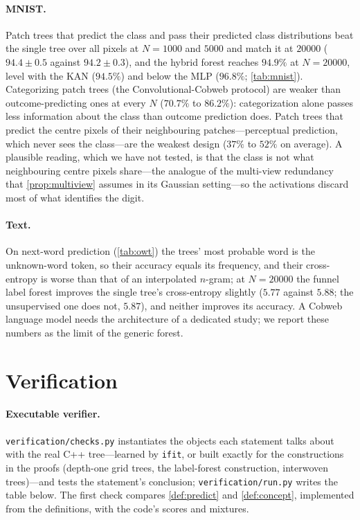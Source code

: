 \documentclass[11pt]{article}
\theoremstyle{definition}
\theoremstyle{remark}
\begin{document}
\paragraph{MNIST.}
Patch trees that predict the class and pass their predicted class distributions beat the
single tree over all pixels at $N=1000$ and $5000$ and match it at $20000$ ($94.4\pm0.5$
against $94.2\pm0.3$), and the hybrid forest reaches $94.9\%$ at
$N=20000$, level with the KAN ($94.5\%$) and below the MLP ($96.8\%$; \cref{tab:mnist}).
Categorizing patch trees (the Convolutional-Cobweb protocol) are weaker than
outcome-predicting ones at every $N$ ($70.7\%$ to $86.2\%$): categorization alone passes
less information about the class than outcome prediction does.  Patch trees that predict
the centre pixels of their neighbouring patches---perceptual prediction, which never sees
the class---are the weakest design ($37\%$ to $52\%$ on average).  A plausible reading, which we have
not tested, is that the class is not what neighbouring centre pixels share---the analogue
of the multi-view redundancy that \cref{prop:multiview} assumes in its Gaussian
setting---so the activations discard most of what identifies the digit.

\paragraph{Text.}
On next-word prediction (\cref{tab:owt}) the trees' most probable word is the unknown-word
token, so their accuracy equals its frequency, and their cross-entropy is worse than that
of an interpolated $n$-gram; at $N=20000$ the funnel label forest improves the single tree's
cross-entropy slightly ($5.77$ against $5.88$; the unsupervised one does not, $5.87$), and
neither improves its accuracy.  A Cobweb language
model needs the architecture of a dedicated study; we report these numbers as the limit
of the generic forest.

\section{Verification}\label{app:verify}

\paragraph{Executable verifier.}
\texttt{verification/checks.py} instantiates the objects each statement talks about with
the real C++ tree---learned by \texttt{ifit}, or built exactly for the constructions in
the proofs (depth-one grid trees, the label-forest construction, interwoven trees)---and
tests the statement's conclusion; \texttt{verification/run.py} writes the table below.
The first check compares \cref{def:predict} and \cref{def:concept}, implemented from the
definitions, with the code's scores and mixtures.
\end{document}
